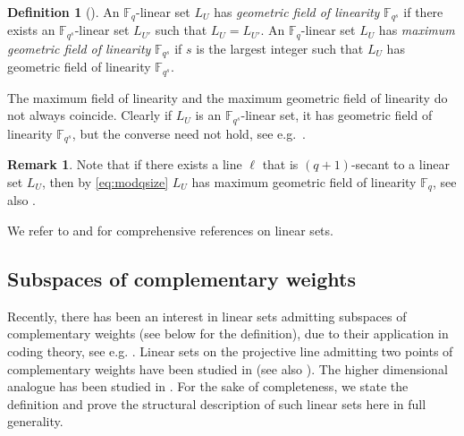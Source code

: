 \documentclass[11pt]{article}
\theoremstyle{definition}
\newtheorem{definition}[theorem]{Definition}
\newtheorem{remark}[theorem]{Remark}
\newcommand{\F}{{\mathbb F}}
\begin{document}
\begin{definition}[{\cite[Definitions 1.3, 1.4]{Jena2021thegeometricfield}}] \label{def:geometricfield}
An $\F_q$-linear set $L_U$ has \emph{geometric field of linearity} $\F_{q^s}$ if there exists an $\F_{q^s}$-linear set $L_{U'}$ such that $L_U=L_{U'}$. An $\F_q$-linear set $L_U$ has \emph{maximum geometric field of linearity} $\F_{q^s}$ if $s$ is the
largest integer such that $L_U$ has geometric field of linearity $\F_{q^s}$.
\end{definition}

The maximum field of linearity and the maximum geometric field of linearity do not always coincide.
Clearly if $L_U$ is an $\F_{q^s}$-linear set, it has geometric field of linearity $\F_{q^s}$, but the converse need not hold, see e.g.\ \cite[Example 1.5]{Jena2021thegeometricfield}.

\begin{remark} \label{rk:secantgeometricfield}
Note that if there exists a line $\ell$ that is $(q+1)$-secant to a linear set $L_U$, then by \eqref{eq:modqsize} $ L_U$ has maximum geometric field of linearity $\F_q$, see also \cite{Jena2021thegeometricfield}.
\end{remark}




We refer to \cite{polverino2010linear} and \cite{lavrauw2015field} for comprehensive references on linear sets.


\subsection{Subspaces of complementary weights}

Recently, there has been an interest in linear sets admitting subspaces of complementary weights (see below for the definition), due to their application in coding theory, see e.g. \cite{polverino2022divisible, Napolitano2023twopoint, Zullo2023multi-orbit}.
Linear sets on the projective line admitting two points of complementary weights have been studied in \cite{napolitano2022linearsets} (see also \cite{Jena2021thegeometricfield,napolitano2022classification}).
The higher dimensional analogue has been studied in \cite{Zullo2023multi-orbit}.
For the sake of completeness, we state the definition and prove the structural description of such linear sets here in full generality.
\end{document}
